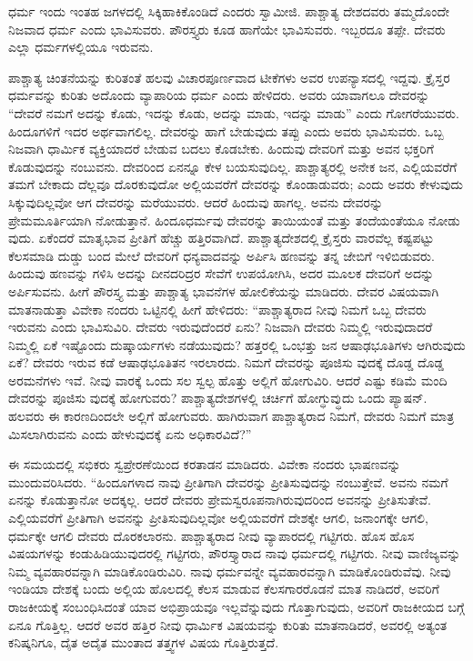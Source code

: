 ಧರ್ಮ ಇಂದು ಇಂತಹ ಜಗಳದಲ್ಲಿ ಸಿಕ್ಕಿಹಾಕಿಕೊಂಡಿದೆ ಎಂದರು ಸ್ವಾಮೀಜಿ. ಪಾಶ್ಚಾತ್ಯ ದೇಶದವರು ತಮ್ಮದೊಂದೇ ನಿಜವಾದ ಧರ್ಮ ಎಂದು ಭಾವಿಸುವರು. ಪೌರಸ್ತ್ಯರು ಕೂಡ ಹಾಗೆಯೇ ಭಾವಿಸುವರು. ಇಬ್ಬರದೂ ತಪ್ಪೇ. ದೇವರು ಎಲ್ಲಾ ಧರ್ಮಗಳಲ್ಲಿಯೂ ಇರುವನು.

ಪಾಶ್ಚಾತ್ಯ ಚಿಂತನೆಯನ್ನು ಕುರಿತಂತೆ ಹಲವು ವಿಚಾರಪೂರ್ಣವಾದ ಟೀಕೆಗಳು ಅವರ ಉಪನ್ಯಾಸದಲ್ಲಿ ಇದ್ದವು. ಕ್ರೈಸ್ತರ ಧರ್ಮವನ್ನು ಕುರಿತು ಅದೊಂದು ವ್ಯಾಪಾರಿಯ ಧರ್ಮ ಎಂದು ಹೇಳಿದರು. ಅವರು ಯಾವಾಗಲೂ ದೇವರನ್ನು “ದೇವರೆ ನಮಗೆ ಅದನ್ನು ಕೊಡು, ಇದನ್ನು ಕೊಡು, ಅದನ್ನು ಮಾಡು, ಇದನ್ನು ಮಾಡು” ಎಂದು ಗೋಗರೆಯುವರು. ಹಿಂದೂಗಳಿಗೆ ಇದರ ಅರ್ಥವಾಗಲಿಲ್ಲ. ದೇವರನ್ನು ಹಾಗೆ ಬೇಡುವುದು ತಪ್ಪು ಎಂದು ಅವರು ಭಾವಿಸುವರು. ಒಬ್ಬ ನಿಜವಾಗಿ ಧಾರ್ಮಿಕ ವ್ಯಕ್ತಿಯಾದರೆ ಬೇಡುವ ಬದಲು ಕೊಡಬೇಕು. ಹಿಂದುವು ದೇವರಿಗೆ ಮತ್ತು ಅವನ ಭಕ್ತರಿಗೆ ಕೊಡುವುದನ್ನು ನಂಬುವನು. ದೇವರಿಂದ ಏನನ್ನೂ ಕೇಳ ಬಯಸುವುದಿಲ್ಲ. ಪಾಶ್ಚಾತ್ಯರಲ್ಲಿ ಅನೇಕ ಜನ, ಎಲ್ಲಿಯವರೆಗೆ ತಮಗೆ ಬೇಕಾದು ದೆಲ್ಲವೂ ದೊರಕುವುದೋ ಅಲ್ಲಿಯವರೆಗೆ ದೇವರನ್ನು ಕೊಂಡಾಡುವರು; ಎಂದು ಅವರು ಕೇಳುವುದು ಸಿಕ್ಕುವುದಿಲ್ಲವೋ ಆಗ ದೇವರನ್ನು ಮರೆಯುವರು. ಆದರೆ ಹಿಂದುವು ಹಾಗಲ್ಲ. ಅವನು ದೇವರನ್ನು ಪ್ರೇಮಮೂರ್ತಿಯಾಗಿ ನೋಡುತ್ತಾನೆ. ಹಿಂದೂಧರ್ಮವು ದೇವರನ್ನು ತಾಯಿಯಂತೆ ಮತ್ತು ತಂದೆಯಂತೆಯೂ ನೋಡು ವುದು. ಏಕೆಂದರೆ ಮಾತೃಭಾವ ಪ್ರೀತಿಗೆ ಹೆಚ್ಚು ಹತ್ತಿರವಾಗಿದೆ. ಪಾಶ್ಚಾತ್ಯದೇಶದಲ್ಲಿ ಕ್ರೈಸ್ತರು ವಾರವೆಲ್ಲ ಕಷ್ಟಪಟ್ಟು ಕೆಲಸಮಾಡಿ ದುಡ್ಡು ಬಂದ ಮೇಲೆ ದೇವರಿಗೆ ಧನ್ಯವಾದವನ್ನು ಅರ್ಪಿಸಿ ಹಣವನ್ನು ತನ್ನ ಜೇಬಿಗೆ ಇಳಿಬಿಡುವರು. ಹಿಂದುವು ಹಣವನ್ನು ಗಳಿಸಿ ಅದನ್ನು ದೀನದರಿದ್ರರ ಸೇವೆಗೆ ಉಪಯೋಗಿಸಿ, ಅದರ ಮೂಲಕ ದೇವರಿಗೆ ಅದನ್ನು ಅರ್ಪಿಸುವನು. ಹೀಗೆ ಪೌರಸ್ತ್ಯ ಮತ್ತು ಪಾಶ್ಚಾತ್ಯ ಭಾವನೆಗಳ ಹೋಲಿಕೆಯನ್ನು ಮಾಡಿದರು. ದೇವರ ವಿಷಯವಾಗಿ ಮಾತನಾಡುತ್ತಾ ವಿವೇಕಾ ನಂದರು ಒಟ್ಟಿನಲ್ಲಿ ಹೀಗೆ ಹೇಳಿದರು: “ಪಾಶ್ಚಾತ್ಯರಾದ ನೀವು ನಿಮಗೆ ಒಬ್ಬ ದೇವರು ಇರುವನು ಎಂದು ಭಾವಿಸುವಿರಿ. ದೇವರು ಇರುವುದೆಂದರೆ ಏನು? ನಿಜವಾಗಿ ದೇವರು ನಿಮ್ಮಲ್ಲಿ ಇರುವುದಾದರೆ ನಿಮ್ಮಲ್ಲಿ ಏಕೆ ಇಷ್ಟೊಂದು ದುಷ್ಕಾರ್ಯಗಳು ನಡೆಯುವುದು? ಹತ್ತರಲ್ಲಿ ಒಂಭತ್ತು ಜನ ಆಷಾಢಭೂತಿಗಳು ಆಗಿರುವುದು ಏಕೆ? ದೇವರು ಇರುವ ಕಡೆ ಆಷಾಢಭೂತಿತನ ಇರಲಾರದು. ನಿಮಗೆ ದೇವರನ್ನು ಪೂಜಿಸು ವುದಕ್ಕೆ ದೊಡ್ಡ ದೊಡ್ಡ ಅರಮನೆಗಳು ಇವೆ. ನೀವು ವಾರಕ್ಕೆ ಒಂದು ಸಲ ಸ್ವಲ್ಪ ಹೊತ್ತು ಅಲ್ಲಿಗೆ ಹೋಗುವಿರಿ. ಆದರೆ ಎಷ್ಟು ಕಡಿಮೆ ಮಂದಿ ದೇವರನ್ನು ಪೂಜಿಸು ವುದಕ್ಕೆ ಹೋಗುವರು? ಪಾಶ್ಚಾತ್ಯದೇಶಗಳಲ್ಲಿ ಚರ್ಚಿಗೆ ಹೋಗ್ಧುವ್ಧುದು ಒಂದು ಪ್ಯಾಷನ್. ಹಲವರು ಈ ಕಾರಣದಿಂದಲೇ ಅಲ್ಲಿಗೆ ಹೋಗುವರು. ಹಾಗಿರುವಾಗ ಪಾಶ್ಚಾತ್ಯರಾದ ನಿಮಗೆ, ದೇವರು ನಿಮಗೆ ಮಾತ್ರ ಮಿಸಲಾಗಿರುವನು ಎಂದು ಹೇಳುವುದಕ್ಕೆ ಏನು ಅಧಿಕಾರವಿದೆ?''

ಈ ಸಮಯದಲ್ಲಿ ಸಭಿಕರು ಸ್ವಪ್ರೇರಣೆಯಿಂದ ಕರತಾಡನ ಮಾಡಿದರು. ವಿವೇಕಾ ನಂದರು ಭಾಷಣವನ್ನು ಮುಂದುವರಿಸಿದರು. “ಹಿಂದೂಗಳಾದ ನಾವು ಪ್ರೀತಿಗಾಗಿ ದೇವರನ್ನು ಪ್ರೀತಿಸುವುದನ್ನು ನಂಬುತ್ತೇವೆ. ಅವನು ನಮಗೆ ಏನನ್ನು ಕೊಡುತ್ತಾನೋ ಅದಕ್ಕಲ್ಲ. ಆದರೆ ದೇವರು ಪ್ರೇಮಸ್ವರೂಪನಾಗಿರುವುದರಿಂದ ಅವನನ್ನು ಪ್ರೀತಿಸುತೇವೆ. ಎಲ್ಲಿಯವರೆಗೆ ಪ್ರೀತಿಗಾಗಿ ಅವನನ್ನು ಪ್ರೀತಿಸುವುದಿಲ್ಲವೋ ಅಲ್ಲಿಯವರೆಗೆ ದೇಶಕ್ಕೇ ಆಗಲಿ, ಜನಾಂಗಕ್ಕೇ ಆಗಲಿ, ಧರ್ಮಕ್ಕೇ ಆಗಲಿ ದೇವರು ದೊರಕಲಾರನು. ಪಾಶ್ಚಾತ್ಯರಾದ ನೀವು ವ್ಯಾಪಾರದಲ್ಲಿ ಗಟ್ಟಿಗರು. ಹೊಸ ಹೊಸ ವಿಷಯಗಳನ್ನು ಕಂಡುಹಿಡಿಯುವುದರಲ್ಲಿ ಗಟ್ಟಿಗರು, ಪೌರಸ್ತ್ಯಾರಾದ ನಾವು ಧರ್ಮದಲ್ಲಿ ಗಟ್ಟಿಗರು. ನೀವು ವಾಣಿಜ್ಯವನ್ನು ನಿಮ್ಮ ವ್ಯವಹಾರವನ್ನಾಗಿ ಮಾಡಿಕೊಂಡಿರುವಿರಿ. ನಾವು ಧರ್ಮವನ್ನೇ ವ್ಯವಹಾರವನ್ನಾಗಿ ಮಾಡಿಕೊಂಡಿರುವೆವು. ನೀವು ಇಂಡಿಯಾ ದೇಶಕ್ಕೆ ಬಂದು ಅಲ್ಲಿಯ ಹೊಲದಲ್ಲಿ ಕೆಲಸ ಮಾಡುವ ಕೆಲಸಗಾರರೊಡನೆ ಮಾತ ನಾಡಿದರೆ, ಅವರಿಗೆ ರಾಜಕೀಯಕ್ಕೆ ಸಂಬಂಧಿಸಿದಂತೆ ಯಾವ ಅಭಿಪ್ರಾಯವೂ ಇಲ್ಲವೆನ್ನುವುದು ಗೊತ್ತಾಗುವುದು, ಅವರಿಗೆ ರಾಜಕೀಯದ ಬಗ್ಗೆ ಏನೂ ಗೊತ್ತಿಲ್ಲ. ಆದರೆ ಅವರ ಹತ್ತಿರ ನೀವು ಧಾರ್ಮಿಕ ವಿಷಯವನ್ನು ಕುರಿತು ಮಾತನಾಡಿದರೆ, ಅವರಲ್ಲಿ ಅತ್ಯಂತ ಕನಿಷ್ಕನಿಗೂ, ದೈತ ಅದೈತ ಮುಂತಾದ ತತ್ತ್ವಗಳ ವಿಷಯ ಗೊತ್ತಿರುತ್ತದೆ.


